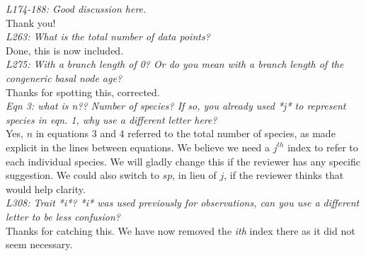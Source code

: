 \documentclass[11pt]{article}
\begin{document}
\emph{L174-188: Good discussion here.}\\
Thank you!\\ %

\emph{L263: What is the total number of data points?}\\
Done, this is now included.\\ 

\emph{L275: With a branch length of 0? Or do you mean with a branch length of the congeneric basal node age?}\\
Thanks for spotting this, corrected.\\

\emph{Eqn 3: what is n?? Number of species? If so, you already used *j* to represent species in eqn. 1, why use a different letter here?}\\
Yes, $n$ in equations 3 and 4 referred to the total number of species, as made explicit in the lines between equations. We believe we need a $j^{th}$ index to refer to each individual species. We will gladly change this if the reviewer has any specific suggestion. We could also switch to $sp$, in lieu of $j$, if the reviewer thinks that would help clarity.\\


\emph{L308: Trait *i*? *i* was used previously for observations, can you use a different letter to be less confusion?}\\
Thanks for catching this. We have now removed the \emph{ith} index there as it did not seem necessary.\\



\end{document}
